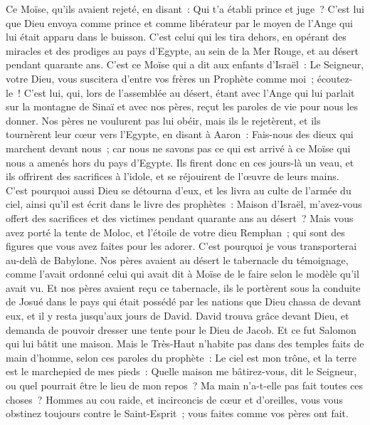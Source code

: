 \begin{multicols}{2}
Ce Moïse, qu'ils avaient rejeté, en disant~: Qui t'a établi prince et juge~? C'est lui que Dieu envoya comme prince et comme libérateur par le moyen de l'Ange qui lui était apparu dans le buisson.
C'est celui qui les tira dehors, en opérant des miracles et des prodiges au pays d'Egypte, au sein de la Mer Rouge, et au désert pendant quarante ans.
C'est ce Moïse qui a dit aux enfants d'Israël~: Le Seigneur, votre Dieu, vous suscitera d'entre vos frères un Prophète comme moi~; écoutez-le~!
C'est lui, qui, lors de l'assemblée au désert, étant avec l'Ange qui lui parlait sur la montagne de Sinaï et avec nos pères, reçut les paroles de vie pour nous les donner.
Nos pères ne voulurent pas lui obéir, mais ils le rejetèrent, et ils tournèrent leur cœur vers l'Egypte,
en disant à Aaron~: Fais-nous des dieux qui marchent devant nous~; car nous ne savons pas ce qui est arrivé à ce Moïse qui nous a amenés hors du pays d'Egypte.
Ils firent donc en ces jours-là un veau, et ils offrirent des sacrifices à l'idole, et se réjouirent de l'œuvre de leurs mains.
C'est pourquoi aussi Dieu se détourna d'eux, et les livra au culte de l'armée du ciel, ainsi qu'il est écrit dans le livre des prophètes~: Maison d'Israël, m'avez-vous offert des sacrifices et des victimes pendant quarante ans au désert~?
Mais vous avez porté la tente de Moloc, et l'étoile de votre dieu Remphan~; qui sont des figures que vous avez faites pour les adorer. C'est pourquoi je vous transporterai au-delà de Babylone.
Nos pères avaient au désert le tabernacle du témoignage, comme l'avait ordonné celui qui avait dit à Moïse de le faire selon le modèle qu'il avait vu.
Et nos pères avaient reçu ce tabernacle, ils le portèrent sous la conduite de Josué dans le pays qui était possédé par les nations que Dieu chassa de devant eux, et il y resta jusqu'aux jours de David.
David trouva grâce devant Dieu, et demanda de pouvoir dresser une tente pour le Dieu de Jacob.
Et ce fut Salomon qui lui bâtit une maison.
Mais le Très-Haut n'habite pas dans des temples faits de main d'homme, selon ces paroles du prophète~:
Le ciel est mon trône, et la terre est le marchepied de mes pieds~: Quelle maison me bâtirez-vous, dit le Seigneur, ou quel pourrait être le lieu de mon repos~?
Ma main n'a-t-elle pas fait toutes ces choses~?
Hommes au cou raide, et incirconcis de cœur et d'oreilles, vous vous obstinez toujours contre le Saint-Esprit~; vous faites comme vos pères ont fait.

\end{multicols}
